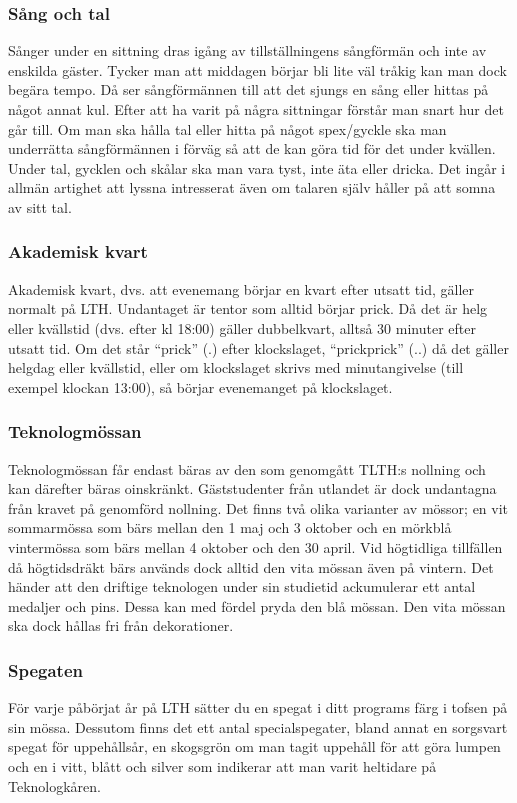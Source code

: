 \documentclass{article}
\begin{document}
\subsubsection{Sång och tal}
Sånger under en sittning dras igång av tillställningens
sångförmän och inte av enskilda gäster. Tycker man att
middagen börjar bli lite väl tråkig kan man dock begära
tempo. Då ser sångförmännen till att det sjungs en sång
eller hittas på något annat kul. Efter att ha varit på några
sittningar förstår man snart hur det går till. Om man ska
hålla tal eller hitta på något spex/gyckle ska man
underrätta sångförmännen i förväg så att de kan göra tid
för det under kvällen. Under tal, gycklen och skålar ska
man vara tyst, inte äta eller dricka. Det ingår i allmän
artighet att lyssna intresserat även om talaren själv håller
på att somna av sitt tal.


\subsubsection{Akademisk kvart}
Akademisk kvart, dvs. att evenemang börjar en kvart efter
utsatt tid, gäller normalt på LTH. Undantaget är tentor
som alltid börjar prick. Då det är helg eller kvällstid (dvs.
efter kl 18:00) gäller dubbelkvart, alltså 30 minuter efter
utsatt tid. Om det står “prick” (.) efter klockslaget,
“prickprick” (..) då det gäller helgdag eller kvällstid, eller
om klockslaget skrivs med minutangivelse (till exempel klockan 13:00), så börjar evenemanget på klockslaget.
\newpage
\subsubsection{Teknologmössan}
Teknologmössan får endast bäras av den som genomgått
TLTH:s nollning och kan därefter bäras oinskränkt.
Gäststudenter från utlandet är dock undantagna från
kravet på genomförd nollning. Det finns två olika varianter
av mössor; en vit sommarmössa som bärs mellan den 1
maj och 3 oktober och en mörkblå vintermössa som bärs
mellan 4 oktober och den 30 april. Vid högtidliga tillfällen
då högtidsdräkt bärs används dock alltid den vita mössan
även på vintern.
Det händer att den driftige teknologen under sin studietid
ackumulerar ett antal medaljer och pins. Dessa kan med
fördel pryda den blå mössan. Den vita mössan ska dock
hållas fri från dekorationer.



\subsubsection{Spegaten}
För varje påbörjat år på LTH sätter du en spegat i ditt
programs färg i tofsen på sin mössa. Dessutom finns det
ett antal specialspegater, bland annat en sorgsvart
spegat för uppehållsår, en skogsgrön om man tagit
uppehåll för att göra lumpen och en i vitt, blått och silver
som indikerar att man varit heltidare på Teknologkåren.
\end{document}
